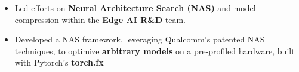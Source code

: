 \documentclass[10pt,a4paper,ragged2e,withhyper]{altacv}
\begin{document}

\begin{paracol}{2}


    \makecvheader{}

    \vspace{-10pt}



    \begin{itemize}
        \item Led efforts on \textbf{Neural Architecture Search (NAS)} and model compression within the \textbf{Edge AI R\&D} team.

        \item Developed a NAS framework, leveraging Qualcomm's patented NAS
              techniques, to optimize \textbf{arbitrary models} on a pre-profiled hardware, built with Pytorch's
              \textbf{torch.fx}


\end{itemize}
\end{paracol}
\end{document}
